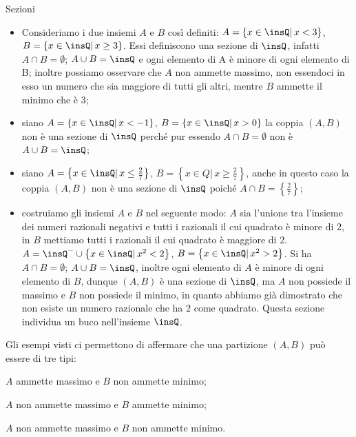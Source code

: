 \begin{exrig}
 \begin{esempio}
 Sezioni
 \begin{itemize}
 \item Consideriamo i due insiemi $A$ e $B$ così definiti: $A=\left\{x\in \insQ |\, x<3\right\}$,
$B=\left\{x\in \insQ |\, x \ge 3\right\}$. Essi definiscono una sezione di $\insQ$, infatti
$A \cap B=\emptyset$; $A \cup B=\insQ$ e ogni elemento di A è minore di ogni elemento di B; inoltre possiamo osservare che $A$ non ammette massimo, non essendoci in esso un numero che sia maggiore di tutti gli altri, mentre $B$ ammette il minimo che è 3;
 \item siano $A=\left\{x\in \insQ |\, x<-1\right\}$, $B=\left\{x \in \insQ |\, x>0\right\}$ la coppia $(A,B)$ non è una sezione di $\insQ$ perché pur essendo $A\cap B=\emptyset$ non è $A\cup B=\insQ$;
 \item siano $A=\left\{x\in \insQ |\, x \le \frac{2}{7}\right\}$, $B=\left\{x \in Q |\, x \ge \frac{2}{7}\right\}$, anche in questo caso la coppia $(A,B)$ non è una sezione di $\insQ$ poiché $A\cap B=\left\{\frac{2}{7}\right\}$;
 \item costruiamo gli insiemi $A$ e $B$ nel seguente modo: $A$ sia l'unione tra l'insieme dei numeri razionali negativi e tutti i razionali il cui quadrato è minore di 2, in $B$ mettiamo tutti i razionali il cui quadrato è maggiore di 2. $A=\insQ^{-} \cup \left\{x \in \insQ |\, x^{2}<2\right\}$, $B=\left\{x \in \insQ |\, x^{2}>2\right\}$. Si ha $A \cap B=\emptyset$; $A\cup B=\insQ$, inoltre ogni elemento di $A$ è minore di ogni elemento di $B$, dunque $(A,B)$ è una sezione di $\insQ$, ma $A$ non possiede il massimo e $B$ non possiede il minimo, in quanto abbiamo già dimostrato che non esiste un numero razionale che ha $2$ come quadrato. Questa sezione individua un buco nell'insieme $\insQ$.
 \end{itemize}
 \end{esempio}
\end{exrig}

Gli esempi visti ci permettono di affermare che una partizione $(A,B)$ può essere di tre tipi:
\begin{itemize*}
\item $A$ ammette massimo e $B$ non ammette minimo;
\item $A$ non ammette massimo e $B$ ammette minimo;
\item $A$ non ammette massimo e $B$ non ammette minimo.
\end{itemize*}

